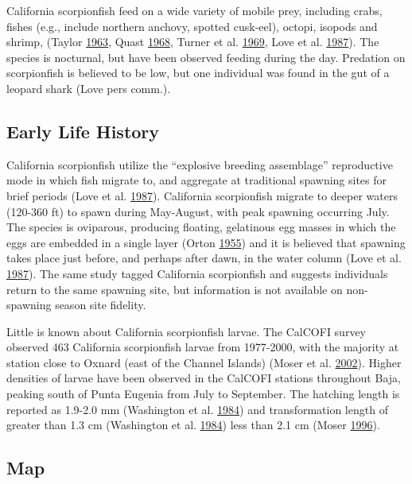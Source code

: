\documentclass[12pt,]{article}
\begin{document}
California scorpionfish feed on a wide variety of mobile prey, including
crabs, fishes (e.g., include northern anchovy, spotted cusk-eel),
octopi, isopods and shrimp, (Taylor
\protect\hyperlink{ref-Taylor1963}{1963}, Quast
\protect\hyperlink{ref-Quast1968}{1968}, Turner et al.
\protect\hyperlink{ref-Turner1969}{1969}, Love et al.
\protect\hyperlink{ref-Love1987}{1987}). The species is nocturnal, but
have been observed feeding during the day. Predation on scorpionfish is
believed to be low, but one individual was found in the gut of a leopard
shark (Love pers comm.).

\subsection{Early Life History}\label{early-life-history}

California scorpionfish utilize the ``explosive breeding assemblage''
reproductive mode in which fish migrate to, and aggregate at traditional
spawning sites for brief periods (Love et al.
\protect\hyperlink{ref-Love1987}{1987}). California scorpionfish migrate
to deeper waters (120-360 ft) to spawn during May-August, with peak
spawning occurring July. The species is oviparous, producing floating,
gelatinous egg masses in which the eggs are embedded in a single layer
(Orton \protect\hyperlink{ref-Orton1955}{1955}) and it is believed that
spawning takes place just before, and perhaps after dawn, in the water
column (Love et al. \protect\hyperlink{ref-Love1987}{1987}). The same
study tagged California scorpionfish and suggests individuals return to
the same spawning site, but information is not available on non-spawning
season site fidelity.

Little is known about California scorpionfish larvae. The CalCOFI survey
observed 463 California scorpionfish larvae from 1977-2000, with the
majority at station close to Oxnard (east of the Channel Islands) (Moser
et al. \protect\hyperlink{ref-Moser2002}{2002}). Higher densities of
larvae have been observed in the CalCOFI stations throughout Baja,
peaking south of Punta Eugenia from July to September. The hatching
length is reported as 1.9-2.0 mm (Washington et al.
\protect\hyperlink{ref-Washington1984}{1984}) and transformation length
of greater than 1.3 cm (Washington et al.
\protect\hyperlink{ref-Washington1984}{1984}) less than 2.1 cm (Moser
\protect\hyperlink{ref-Moser1996}{1996}).

\subsection{Map}\label{map}
\end{document}
